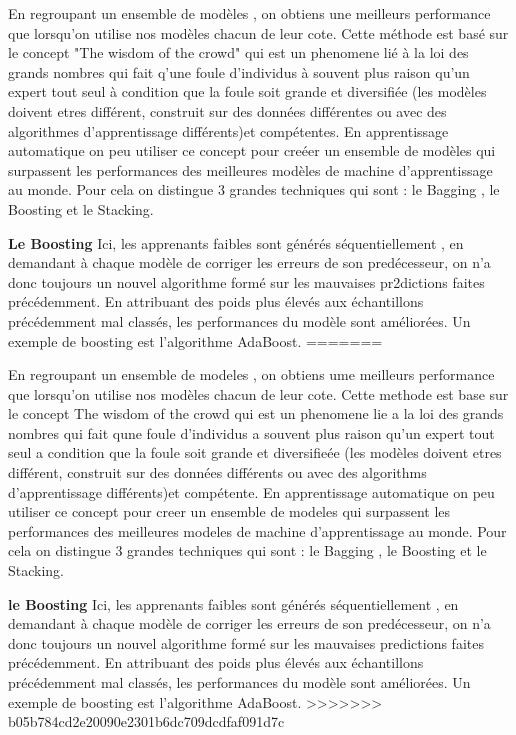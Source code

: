 \documentclass[french,a4paper,12pt]{article}
\begin{document}
\quad En regroupant un ensemble de modèles , on obtiens une meilleurs performance que lorsqu’on utilise nos modèles chacun de leur cote. Cette méthode est basé sur le concept "The wisdom of the crowd" qui est un phenomene lié à la loi des grands nombres qui fait q'une foule d’individus à souvent plus raison qu’un expert tout seul  à condition que la foule soit grande et diversifiée (les modèles doivent etres différent, construit sur des données différentes ou avec des algorithmes d’apprentissage différents)et compétentes. En apprentissage automatique on peu  utiliser ce concept pour creéer un ensemble de modèles qui surpassent les performances des meilleures modèles de machine d’apprentissage au monde\citep{ens}. Pour cela on distingue 3 grandes techniques qui sont : le Bagging , le Boosting et le Stacking.




\textbf{Le Boosting} 
\quad Ici, les apprenants faibles sont générés séquentiellement  , en demandant à chaque modèle de corriger les erreurs de son predécesseur, on n’a donc toujours un nouvel algorithme formé sur les mauvaises pr2dictions faites précédemment\citep{ens}. En attribuant des poids plus élevés aux échantillons précédemment mal classés, les performances du modèle sont améliorées. Un exemple de boosting est l'algorithme AdaBoost.
=======

\quad En regroupant un ensemble de modeles , on obtiens ume meilleurs performance que lorsqu’on utilise nos modèles chacun de leur cote. Cette methode est base sur le concept The wisdom of the crowd qui est un phenomene lie a la loi des grands nombres qui fait qune foule d’individus a souvent plus raison qu’un expert tout seul  a condition que la foule soit grande et diversifieée (les modèles doivent etres différent, construit sur des données différents ou avec des algorithms d’apprentissage différents)et compétente. En apprentissage automatique on peu  utiliser ce concept pour creer un ensemble de modeles qui surpassent les performances des meilleures modeles de machine d’apprentissage au monde\citep{ens}. Pour cela on distingue 3 grandes techniques qui sont : le Bagging , le Boosting et le Stacking.




\textbf{le Boosting} 
\quad Ici, les apprenants faibles sont générés séquentiellement  , en demandant à chaque modèle de corriger les erreurs de son predécesseur, on n’a donc toujours un nouvel algorithme formé sur les mauvaises predictions faites précédemment\citep{ens}. En attribuant des poids plus élevés aux échantillons précédemment mal classés, les performances du modèle sont améliorées. Un exemple de boosting est l'algorithme AdaBoost.
>>>>>>> b05b784cd2e20090e2301b6dc709dcdfaf091d7c
\end{document}
